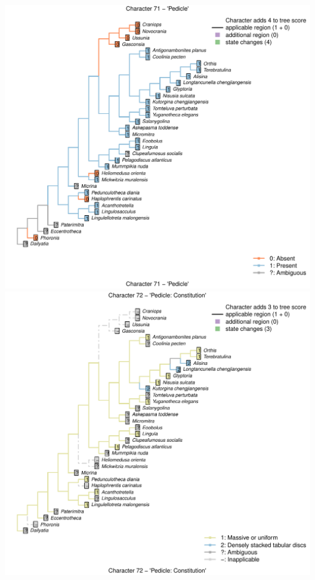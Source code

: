 \documentclass[]{book}
\theoremstyle{definition}
\theoremstyle{definition}
\theoremstyle{definition}
\theoremstyle{remark}
\begin{document}
\includegraphics{Brachiopod_phylogeny_files/figure-latex/unnamed-chunk-4-71.pdf}
\includegraphics{Brachiopod_phylogeny_files/figure-latex/unnamed-chunk-4-72.pdf}
\end{document}
